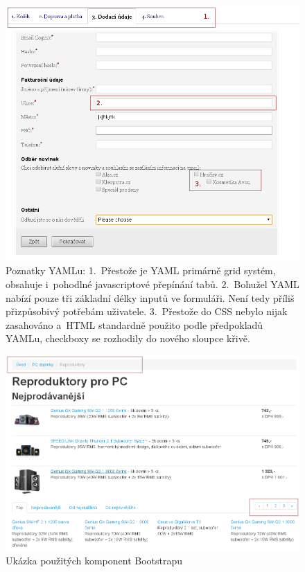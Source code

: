\documentclass[thesis=B,czech]{FITthesis}[2012/06/26]
\begin{document}
\begin{figure}[h]
	\begin{center}
	\includegraphics[scale=0.7]{images/image19.png}
	\end{center}
	\caption[Poznatky YAMLu]{Poznatky YAMLu: 1.~Přestože je YAML primárně grid  systém, obsahuje i~pohodlné javascriptové přepínání tabů. 2.~Bohužel YAML nabízí pouze tři základní délky inputů ve formuláři. Není tedy příliš přizpůsobivý potřebám uživatele. 3.~Přestože do CSS nebylo nijak zasahováno a~HTML standardně použito podle předpokladů YAMLu, checkboxy se rozhodily do nového sloupce křivě.}
	\label{imgCom}
\end{figure}

\begin{figure}[h]
	\begin{center}
	\includegraphics[scale=0.5]{images/image08.png}
	\end{center}
	\caption{Ukázka použitých komponent Bootstrapu}
	\label{imgB1}
\end{figure}
\end{document}
